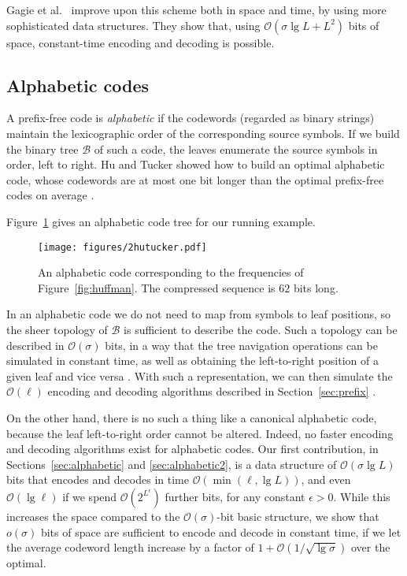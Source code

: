 \documentclass[preprint,12pt]{elsarticle}
\newcommand{\Oh}[1]{\ensuremath{\mathcal{O}\!\left({#1}\right)}}
\newcommand{\B}{\mathcal{B}}
\renewcommand{\log}{\lg}
\begin{document}
Gagie et al.~\cite{GNNO15} improve upon this scheme both in space and time,
by using more sophisticated data structures. They show that, using 
$\Oh{\sigma\log L + L^2}$ bits of space,
constant-time encoding and decoding is possible.

\subsection{Alphabetic codes}
\label{sec:defalpha}

A prefix-free code is {\em alphabetic} if the codewords (regarded as binary 
strings) maintain the lexicographic order of the corresponding source symbols. 
If we build the binary tree $\B$ of such a code, the leaves enumerate the source
symbols in order, left to right. Hu and Tucker \cite{HT71} showed how to build 
an optimal alphabetic code, whose codewords are at most one bit longer than the
optimal prefix-free codes on average \cite{CT06}.

Figure~\ref{fig:alpha} gives an alphabetic code tree for our running example.

\begin{figure}[t]
\begin{center}
\texttt{[image: figures/2hutucker.pdf]}
\end{center}
\vspace*{-5mm}
\caption{An alphabetic code corresponding to the frequencies of 
Figure~\ref{fig:huffman}. The compressed sequence is $62$ bits long.}
\label{fig:alpha}
\end{figure}

In an alphabetic code we do not need to map from symbols to leaf positions,
so the sheer topology of $\B$ is sufficient to describe the code.
Such a topology can be described in $\Oh{\sigma}$ bits, in a way that the
tree navigation operations can be simulated in constant time, as well as 
obtaining the left-to-right position of a given leaf and vice versa \cite{MR01}.
With such a representation, we can then simulate the $\Oh{\ell}$ encoding and
decoding algorithms described in Section~\ref{sec:prefix} \cite{GNNO15}.

On the other hand, there is no such a thing like a canonical alphabetic code,
because the leaf left-to-right order cannot be altered. Indeed, no faster
encoding and decoding algorithms exist for alphabetic codes. Our first 
contribution, in Sections~\ref{sec:alphabetic} and \ref{sec:alphabetic2}, 
is a data structure of
$\Oh{\sigma\log L}$ bits that encodes and decodes in time 
$\Oh{\min(\ell,\log L)}$, and even $\Oh{\log\ell}$ if we spend 
$\Oh{2^{L^\epsilon}}$ further bits, for any constant $\epsilon>0$.
While this increases the space compared to the $\Oh{\sigma}$-bit basic 
structure, we show that $o(\sigma)$ bits of space are sufficient to encode
and decode in constant time, if we let the average codeword length increase
by a factor of $1+\Oh{1/\sqrt{\log\sigma}}$ over the optimal.
\end{document}
